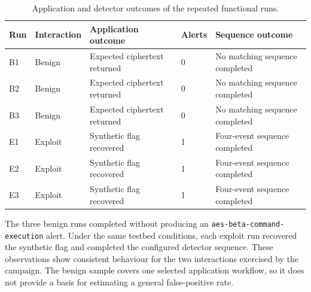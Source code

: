 \begin{table}[H]
    \centering
    \footnotesize
    \setlength{\tabcolsep}{5pt}
    \renewcommand{\arraystretch}{1.14}
    \begin{tabularx}{\textwidth}{
        @{}
        p{}
        p{}
        X
        p{}
        p{}
        @{}
    }
        \toprule
        \textbf{Run} &
        \textbf{Interaction} &
        \textbf{Application outcome} &
        \textbf{Alerts} &
        \textbf{Sequence outcome} \\
        \midrule

        B1 & Benign &
        Expected ciphertext returned &
        0 &
        No matching sequence completed \\

        B2 & Benign &
        Expected ciphertext returned &
        0 &
        No matching sequence completed \\

        B3 & Benign &
        Expected ciphertext returned &
        0 &
        No matching sequence completed \\

        E1 & Exploit &
        Synthetic flag recovered &
        1 &
        Four-event sequence completed \\

        E2 & Exploit &
        Synthetic flag recovered &
        1 &
        Four-event sequence completed \\

        E3 & Exploit &
        Synthetic flag recovered &
        1 &
        Four-event sequence completed \\

        \bottomrule
    \end{tabularx}
    \caption{Application and detector outcomes of the repeated functional runs.}
    \label{tab:evaluation-functional-runs}
\end{table}

The three benign runs completed without producing an
\texttt{aes-beta-command-execution} alert. Under the same testbed conditions,
each exploit run recovered the synthetic flag and completed the configured
detector sequence. These observations show consistent behaviour for the two
interactions exercised by the campaign. The benign sample covers one selected
application workflow, so it does not provide a basis for estimating a general
false-positive rate.

